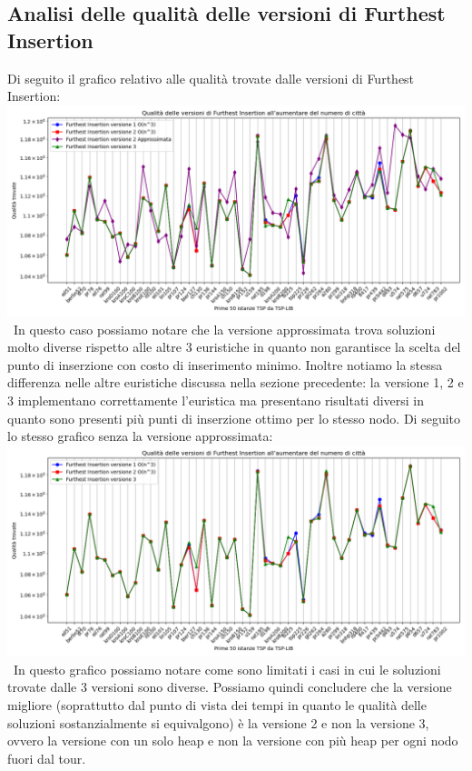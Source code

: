 \documentclass[a4paper,12pt]{report}
\begin{document}
\subsection{Analisi delle qualità delle versioni di Furthest Insertion}
Di seguito il grafico relativo alle qualità trovate dalle versioni di Furthest Insertion: \newline
\includegraphics[width=1\textwidth]{../Grafici/6.png} \
In questo caso possiamo notare che la versione approssimata trova soluzioni molto diverse rispetto alle altre 3 euristiche in quanto non garantisce la scelta del punto di inserzione con costo di inserimento minimo. Inoltre notiamo la stessa differenza nelle altre euristiche discussa nella sezione precedente: la versione 1, 2 e 3 implementano correttamente l'euristica ma presentano risultati diversi in quanto sono presenti più punti di inserzione ottimo per lo stesso nodo. Di seguito lo stesso grafico senza la versione approssimata: \newline
\includegraphics[width=1\textwidth]{../Grafici/6_2.png} \
In questo grafico possiamo notare come sono limitati i casi in cui le soluzioni trovate dalle 3 versioni sono diverse. \newline
Possiamo quindi concludere che la versione migliore (soprattutto dal punto di vista dei tempi in quanto le qualità delle soluzioni sostanzialmente si equivalgono) è la versione 2 e non la versione 3, ovvero la versione con un solo heap e non la versione con più heap per ogni nodo fuori dal tour.
\end{document}
